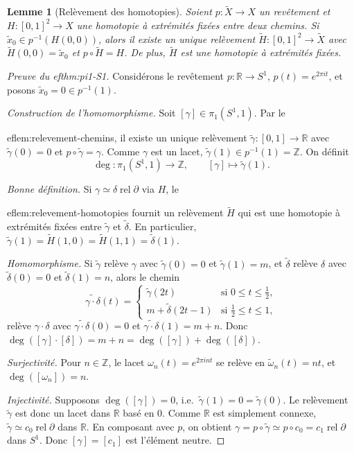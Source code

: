 \documentclass[12pt,a4paper,openany]{book}
\theoremstyle{definition}
\theoremstyle{plain}
\newtheorem{lemme}[definition]{Lemme}
\theoremstyle{remark}
\newcommand{\Z}{\mathbb{Z}}
\newcommand{\R}{\mathbb{R}}
\newcommand{\rel}{\operatorname{rel}}
\begin{document}
\begin{lemme}[Relèvement des homotopies]\label{lem:relevement-homotopies}
Soient $p : \widetilde{X} \to X$ un revêtement et $H : [0,1]^2 \to X$ une
homotopie à extrémités fixées entre deux chemins. Si
$\widetilde{x}_0 \in p^{-1}(H(0,0))$, alors il existe un unique relèvement
$\widetilde{H} : [0,1]^2 \to \widetilde{X}$ avec
$\widetilde{H}(0,0) = \widetilde{x}_0$ et
$p \circ \widetilde{H} = H$. De plus, $\widetilde{H}$ est une homotopie à
extrémités fixées.
\end{lemme}

\begin{proof}[Preuve du 
ef{thm:pi1-S1}]
Considérons le revêtement $p : \R \to S^1$, $p(t) = e^{2\pi i t}$, et posons
$\widetilde{x}_0 = 0 \in p^{-1}(1)$.

\emph{Construction de l'homomorphisme.} Soit $[\gamma] \in \pi_1(S^1, 1)$. Par le

ef{lem:relevement-chemins}, il existe un unique relèvement
$\widetilde{\gamma} : [0,1] \to \R$ avec $\widetilde{\gamma}(0) = 0$ et
$p \circ \widetilde{\gamma} = \gamma$. Comme $\gamma$ est un lacet,
$\widetilde{\gamma}(1) \in p^{-1}(1) = \Z$. On définit
\[
\deg : \pi_1(S^1, 1) \longrightarrow \Z, \qquad [\gamma] \longmapsto \widetilde{\gamma}(1).
\]

\emph{Bonne définition.} Si $\gamma \simeq \delta \rel \partial$ via $H$, le

ef{lem:relevement-homotopies} fournit un relèvement $\widetilde{H}$ qui est
une homotopie à extrémités fixées entre $\widetilde{\gamma}$ et
$\widetilde{\delta}$. En particulier,
$\widetilde{\gamma}(1) = \widetilde{H}(1,0) = \widetilde{H}(1,1) = \widetilde{\delta}(1)$.

\emph{Homomorphisme.} Si $\widetilde{\gamma}$ relève $\gamma$ avec
$\widetilde{\gamma}(0) = 0$ et $\widetilde{\gamma}(1) = m$, et
$\widetilde{\delta}$ relève $\delta$ avec $\widetilde{\delta}(0) = 0$ et
$\widetilde{\delta}(1) = n$, alors le chemin
\[
\widetilde{\gamma \cdot \delta}(t) = \begin{cases}
\widetilde{\gamma}(2t) & \text{si } 0 \leqslant t \leqslant \tfrac{1}{2}, \\
m + \widetilde{\delta}(2t-1) & \text{si } \tfrac{1}{2} \leqslant t \leqslant 1,
\end{cases}
\]
relève $\gamma \cdot \delta$ avec $\widetilde{\gamma \cdot \delta}(0) = 0$ et
$\widetilde{\gamma \cdot \delta}(1) = m + n$. Donc $\deg([\gamma] \cdot [\delta]) = m + n = \deg([\gamma]) + \deg([\delta])$.

\emph{Surjectivité.} Pour $n \in \Z$, le lacet $\omega_n(t) = e^{2\pi i n t}$
se relève en $\widetilde{\omega}_n(t) = nt$, et $\deg([\omega_n]) = n$.

\emph{Injectivité.} Supposons $\deg([\gamma]) = 0$, i.e.\
$\widetilde{\gamma}(1) = 0 = \widetilde{\gamma}(0)$. Le relèvement
$\widetilde{\gamma}$ est donc un lacet dans $\R$ basé en $0$. Comme $\R$ est
simplement connexe, $\widetilde{\gamma} \simeq c_0 \rel \partial$ dans $\R$.
En composant avec $p$, on obtient $\gamma = p \circ \widetilde{\gamma} \simeq
p \circ c_0 = c_1 \rel \partial$ dans $S^1$. Donc $[\gamma] = [c_1]$ est
l'élément neutre.
\end{proof}
\end{document}
